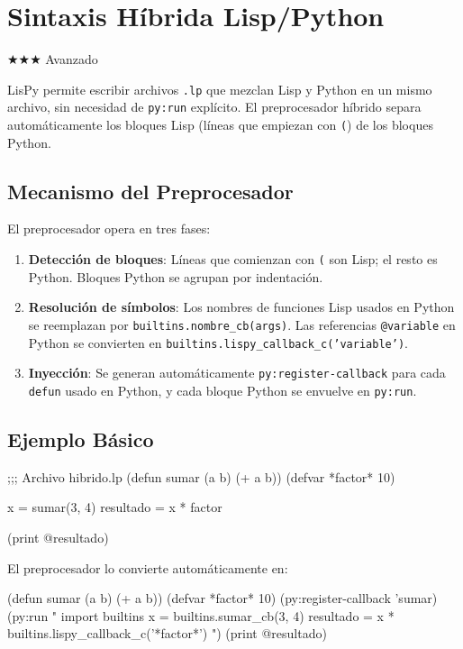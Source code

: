 \chapter{Sintaxis Híbrida Lisp/Python}
\label{chap:hybrid-syntax}
{\huge$\bigstar$}{\huge$\bigstar$}{\huge$\bigstar$} Avanzado

LisPy permite escribir archivos \texttt{.lp} que mezclan Lisp y Python en un mismo
archivo, sin necesidad de \texttt{py:run} explícito. El preprocesador híbrido separa
automáticamente los bloques Lisp (líneas que empiezan con \texttt{(}) de los bloques Python.

\section{Mecanismo del Preprocesador}

El preprocesador opera en tres fases:
\begin{enumerate}
\item \textbf{Detección de bloques}: Líneas que comienzan con \texttt{(} son Lisp;
      el resto es Python. Bloques Python se agrupan por indentación.
\item \textbf{Resolución de símbolos}: Los nombres de funciones Lisp usados en
      Python se reemplazan por \texttt{builtins.nombre\_cb(args)}.
      Las referencias \texttt{@variable} en Python se convierten en
      \texttt{builtins.lispy\_callback\_c('variable')}.
\item \textbf{Inyección}: Se generan automáticamente \texttt{py:register-callback}
      para cada \texttt{defun} usado en Python, y cada bloque Python se envuelve
      en \texttt{py:run}.
\end{enumerate}

\section{Ejemplo Básico}

\begin{lispcode}
;;; Archivo hibrido.lp
(defun sumar (a b) (+ a b))
(defvar *factor* 10)

x = sumar(3, 4)
resultado = x * factor

(print @resultado)
\end{lispcode}

El preprocesador lo convierte automáticamente en:

\begin{lispcode}
(defun sumar (a b) (+ a b))
(defvar *factor* 10)
(py:register-callback 'sumar)
(py:run "
import builtins
x = builtins.sumar_cb(3, 4)
resultado = x * builtins.lispy_callback_c('*factor*')
")
(print @resultado)
\end{lispcode}


